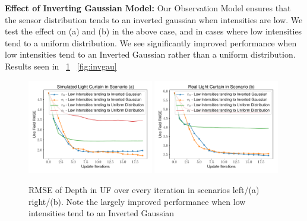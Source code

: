 \textbf{Effect of Inverting Gaussian Model:} Our Observation Model ensures that the sensor distribution tends to an inverted gaussian when intensities are low. We test the effect on (a) and (b) in the above case, and in cases where low intensities tend to a uniform distribution. We see significantly improved performance when low intensities tend to an Inverted Gaussian rather than a uniform distribution. Results seen in ~\ref{fig:figure01} ~\ref{fig:invgau}

\begin{figure}[h]
    \centering
    \begin{minipage}{0.5\textwidth}
        \centering
        \includegraphics[width=0.49\textwidth]{figures/Figure_0.pdf}
        \includegraphics[width=0.49\textwidth]{figures/Figure_1.pdf}
    \end{minipage}\hfill
    \centering
    \caption{RMSE of Depth in UF over every iteration in scenarios left/(a) right/(b). Note the largely improved performance when low intensities tend to an Inverted Gaussian}
    \label{fig:figure01}
\end{figure}

